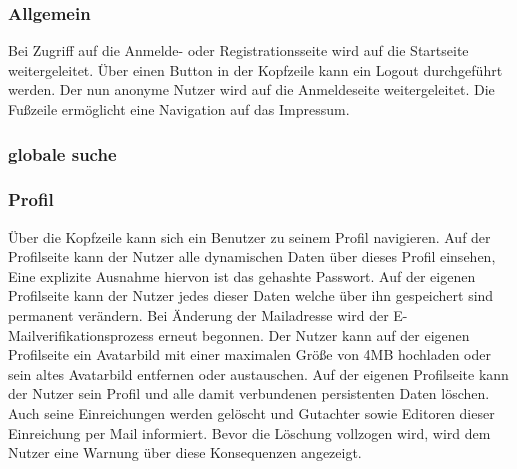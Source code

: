\subsubsection{Allgemein}
\begin{description}
     Bei Zugriff auf die Anmelde- oder Registrationsseite
    wird auf die Startseite weitergeleitet.
     Über einen Button in der Kopfzeile kann ein Logout durchgeführt werden.
    Der nun anonyme Nutzer wird auf die Anmeldeseite weitergeleitet.
     Die Fußzeile ermöglicht eine Navigation auf das Impressum.
\end{description}

\subsubsection{globale suche}

\subsubsection{Profil}
\begin{description}
    \XXitem{}{} Über die Kopfzeile kann sich ein Benutzer zu seinem Profil navigieren.
    \XXitem{}{} Auf der Profilseite kann der Nutzer alle dynamischen Daten über dieses Profil einsehen,
    Eine explizite Ausnahme hiervon ist das gehashte Passwort. %
     Auf der eigenen Profilseite kann der Nutzer jedes dieser Daten %
    welche über ihn gespeichert sind permanent verändern.
     Bei Änderung der Mailadresse wird der E-Mailverifikationsprozess erneut
    begonnen. %
    \XXitem{}{} Der Nutzer kann auf der eigenen Profilseite ein Avatarbild mit einer maximalen
    Größe von 4MB hochladen oder sein altes Avatarbild entfernen oder austauschen. %
    \XXitem{}{} Auf der eigenen Profilseite kann der Nutzer sein Profil und alle damit verbundenen persistenten
    Daten löschen. Auch seine Einreichungen werden gelöscht und Gutachter sowie Editoren dieser
    Einreichung per Mail informiert. Bevor die Löschung vollzogen wird, wird dem Nutzer
    eine Warnung über diese Konsequenzen angezeigt.
\end{description}

